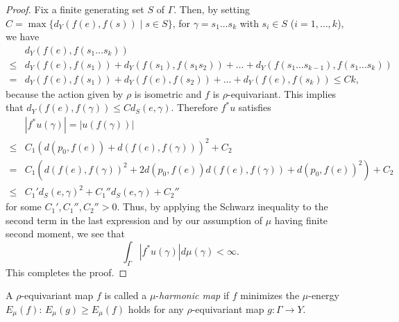 \documentclass[12pt]{amsart}
\numberwithin{equation}{section}
\theoremstyle{plain}
\theoremstyle{definition}
\theoremstyle{remark}
\newcommand{\ene}[1]{E_{#1}}
\begin{document}
\begin{proof}
Fix a finite generating set $S$ of $\Gamma$. 
Then, by setting $C=\max\{d_Y(f(e), f(s))\mid s \in S \}$, 
for $\gamma = s_1 \dots s_k$ with $s_i \in S$ 
($i=1, \dots, k$), we have
\begin{equation*}
\begin{split}
  & d_Y(f(e),f(s_1 \dots s_k)) \\
 \leq & d_Y(f(e), f(s_1)) + d_Y(f(s_1), f(s_1 s_2))
 + \dots + 
   d_Y(f(s_1 \dots s_{k-1}), f(s_1 \dots s_k)) \\
 = & d_Y(f(e), f(s_1)) + d_Y(f(e), f(s_2))
 + \dots + d_Y(f(e), f(s_k)) 
 \leq  Ck, 
\end{split}
\end{equation*}
because the action given by $\rho$ is isometric and $f$ is
$\rho$-equivariant. 
This implies that $d_Y(f(e),f(\gamma)) \leq C d_S(e,\gamma)$.
Therefore $f^*u$ satisfies
\begin{equation*}
 \begin{split}
  & |f^*u(\gamma)| = |u(f(\gamma))| \\
 \leq & C_1 \left(d(p_0, f(e)) + d(f(e),f(\gamma)) \right)^2 + C_2 \\
 = & C_1 \left(d(f(e),f(\gamma))^2 + 
   2 d(p_0,f(e))d(f(e),f(\gamma)) + d(p_0,f(e))^2\right) + C_2 \\
 \leq &  C_1'd_S(e,\gamma)^2 + C_1''d_S(e,\gamma) + C_2''
\end{split}
\end{equation*}
 for some $C_1', C_1'', C_2''>0$. 
 Thus, by applying the Schwarz inequality to the second term in
 the last expression and by our assumption of $\mu$ having
 finite second moment, we see that 
\begin{equation*}
 \int_{\Gamma} |f^*u(\gamma)| d\mu(\gamma) < \infty. 
\end{equation*}
 This completes the proof. 
\end{proof}

%
%
A $\rho$-equivariant map $f$ is called a $\mu$-{\it harmonic map} if $f$
minimizes the $\mu$-energy $\ene{\mu}(f)$: 
$\ene{\mu}(g)\geq \ene{\mu}(f)$ holds for any $\rho$-equivariant map 
$g \colon \Gamma \rightarrow Y$. 
\end{document}
